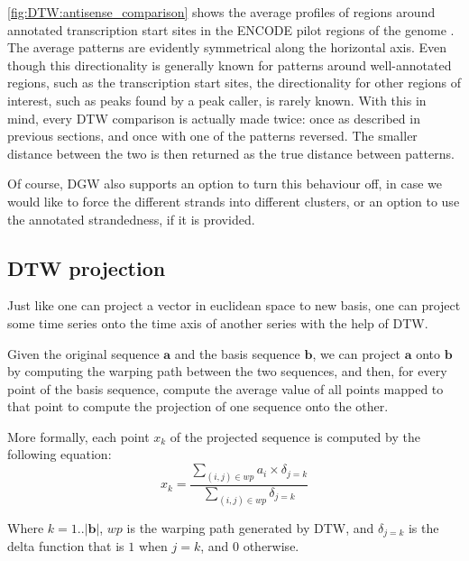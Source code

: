 \documentclass[parskip]{cs4rep}
\begin{document}
\autoref{fig:DTW:antisense_comparison} shows the average profiles of regions around annotated transcription start sites in the ENCODE pilot regions of the genome \cite{ENCODEProjectConsortium:2007fu}. The average patterns are evidently symmetrical along the horizontal axis.
Even though this directionality is generally known for patterns around well-annotated regions, such as the transcription start sites, the directionality for other regions of interest, such as peaks found by a peak caller, is rarely known.  With this in mind, every DTW comparison is actually made twice: once as described in previous sections, and once with one of the patterns reversed. The smaller distance between the two is then returned as the true distance between patterns. 

Of course, DGW also supports an option to turn this behaviour off, in case we would like to force the different strands into different clusters, or an option to use the annotated strandedness, if it is provided.

\subsection{DTW projection}

\label{sec:dtw-projection}

Just like one can project a vector in euclidean space to new basis, one can project some time series onto the time axis of another series with the help of DTW. 

Given the original sequence $\mathbf{a}$ and the basis sequence $\mathbf{b}$, we can project $\mathbf{a}$ onto $\mathbf{b}$ by computing the warping path between the two sequences, 
and then, for every point of the basis sequence, compute the average value of all points mapped to that point to compute the projection of one sequence onto the other.

More formally, each point $x_k$ of the projected sequence is computed by the following equation:
\begin{equation}
    x_k =  \frac{\sum_{(i,j) \in wp} a_i \times \delta_{j=k}}{\sum_{(i,j) \in wp} \delta_{j=k}} 
\end{equation}

Where $k=1..|\mathbf{b}|$, $wp$ is the warping path generated by DTW, and $\delta_{j=k}$ is the delta function that is $1$ when $j=k$, and $0$ otherwise.
\end{document}
